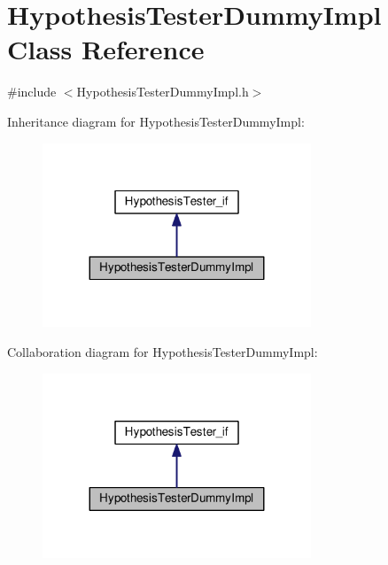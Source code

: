 \hypertarget{class_hypothesis_tester_dummy_impl}{}\section{Hypothesis\+Tester\+Dummy\+Impl Class Reference}
\label{class_hypothesis_tester_dummy_impl}


{\ttfamily \#include $<$Hypothesis\+Tester\+Dummy\+Impl.\+h$>$}



Inheritance diagram for Hypothesis\+Tester\+Dummy\+Impl\+:\nopagebreak
\begin{figure}[H]
\begin{center}
\leavevmode
\includegraphics[width=227pt]{class_hypothesis_tester_dummy_impl__inherit__graph}
\end{center}
\end{figure}


Collaboration diagram for Hypothesis\+Tester\+Dummy\+Impl\+:\nopagebreak
\begin{figure}[H]
\begin{center}
\leavevmode
\includegraphics[width=227pt]{class_hypothesis_tester_dummy_impl__coll__graph}
\end{center}
\end{figure}
